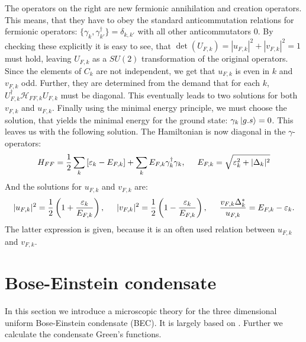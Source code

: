The operators on the right are new fermionic annihilation and creation operators. This means, that they have to obey the standard anticommutation relations for fermionic operators: $\{\gamma_k,\gamma_{k'}^\dagger \} = \delta_{k,k'}$ with all other anticommutators 0. By checking these explicitly it is easy to see, that $\det(U_{F,k}) = |u_{F,k}|^2+|v_{F,k}|^2 = 1$ must hold, leaving $U_{F,k}$ as a $SU(2)$ transformation of the original operators. Since the elements of $C_k$ are not independent, we get that $u_{F,k}$ is even in $k$ and $v_{F,k}$ odd. Further, they are determined from the demand that for each $k$, $U^\dagger_{F,k} \mathcal{H}_{FF,k}U_{F,k}$ must be diagonal. This eventually leads to two solutions for both $v_{F,k}$ and $u_{F,k}$. Finally using the minimal energy principle, we must choose the solution, that yields the minimal energy for the ground state: $\gamma_k\ket{g.s} = 0$. This leaves us with the following solution. The Hamiltonian is now diagonal in the $\gamma$-operators: 
\begin{equation}
H_{FF} = \frac{1}{2}\sum_k \left[\varepsilon_k-E_{F,k}\right] + \sum_k E_{F,k} \gamma^\dagger_k \gamma_k, \hspace{0.5cm} E_{F,k} = \sqrt{\varepsilon_k^2 + |\Delta_k|^2}
\label{eq.Kitaev.H_diagonalpre}
\end{equation}
And the solutions for $u_{F,k}$ and $v_{F,k}$ are: 
\begin{equation}
|u_{F,k}|^2 = \frac{1}{2}\left(1 + \frac{\varepsilon_k}{E_{F,k}}\right), \hspace{0.5cm} |v_{F,k}|^2 = \frac{1}{2}\left(1-\frac{\varepsilon_k}{E_{F,k}}\right), \hspace{0.5cm} \frac{v_{F,k}\Delta^*_k}{u_{F,k}}=E_{F,k}-\varepsilon_k.
\label{eq.Kitaev.uk_vk}
\end{equation}
The latter expression is given, because it is an often used relation between $u_{F,k}$ and $v_{F,k}$. 

\section{Bose-Einstein condensate}
In this section we introduce a microscopic theory for the three dimensional uniform Bose-Einstein condensate (BEC). It is largely based on \cite[chapter 8]{Pethick}. Further we calculate the condensate Green's functions. 


